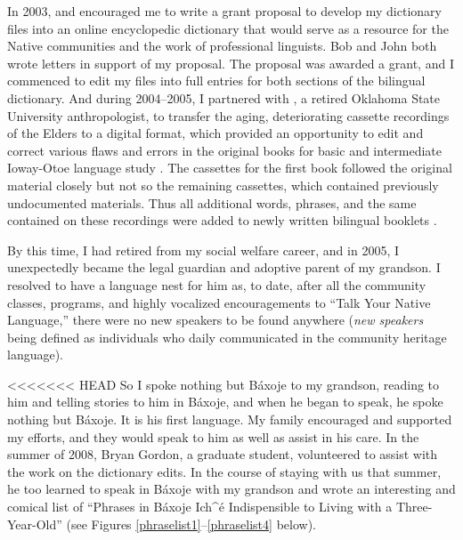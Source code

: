 \documentclass[output=paper]{LSP/langsci}
\begin{document}
In 2003,  and  encouraged me to write a grant proposal to develop my dictionary files into an online encyclopedic dictionary that would serve as a resource for the Native communities and the work of professional linguists. Bob and John both wrote letters in support of my proposal. The proposal was awarded a grant, and I commenced to edit my files into full entries for both sections of the bilingual dictionary. And during 2004--2005, I partnered with , a retired Oklahoma State University anthropologist, to transfer the aging, deteriorating cassette recordings of the Elders to a digital format, which provided an opportunity to edit and correct various flaws and errors in the original books for basic and intermediate Ioway-Otoe language study \citep{OtoeIowaWistrandRobinson1977, OtoeIowaWistrandRobinson1978}. The cassettes for the first book followed the original material closely but not so the remaining cassettes, which contained previously undocumented materials. Thus all additional words, phrases, and the same contained on these recordings were added to newly written bilingual booklets \citep{Goodtracks2004a, Goodtracks2004b}.

By this time, I had retired from my social welfare career, and in 2005, I unexpectedly became the legal guardian and adoptive parent of my grandson. I resolved to have a language nest for him as, to date, after all the community classes, programs, and highly vocalized encouragements to ``Talk Your Native Language,'' there were no new speakers to be found anywhere (\emph{new speakers} being defined as individuals who daily communicated in the community heritage language).  

<<<<<<< HEAD
So I spoke nothing but Báxoje to my grandson, reading to him and telling stories to him in Báxoje, and when he began to speak, he spoke nothing but Báxoje. It is his first language. My family encouraged and supported my efforts, and they would speak to him as well as assist in his care. In the summer of 2008, Bryan Gordon, a graduate student, volunteered to assist with the work on the dictionary edits. In the course of staying with us that summer, he too learned to speak in Báxoje with my grandson and wrote an interesting and comical list of ``Phrases in Báxoje Ich\^{ }\'e Indispensible to Living with a Three-Year-Old'' (see Figures \ref{phraselist1}--\ref{phraselist4} below).
\end{document}
